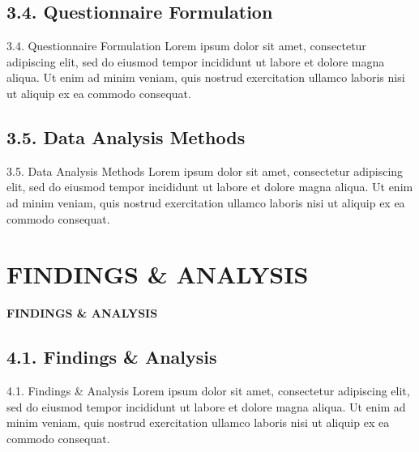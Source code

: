 \documentclass[11pt]{beamer}%
\begin{document}
\subsection{3.4. Questionnaire Formulation}
\begin{frame}{3.4. Questionnaire Formulation}
	Lorem ipsum dolor sit amet, consectetur adipiscing elit, sed do eiusmod tempor incididunt ut labore et dolore magna aliqua. Ut enim ad minim veniam, quis nostrud exercitation ullamco laboris nisi ut aliquip ex ea commodo consequat.
\end{frame}

\subsection{3.5. Data Analysis Methods}
\begin{frame}{3.5. Data Analysis Methods}
	Lorem ipsum dolor sit amet, consectetur adipiscing elit, sed do eiusmod tempor incididunt ut labore et dolore magna aliqua. Ut enim ad minim veniam, quis nostrud exercitation ullamco laboris nisi ut aliquip ex ea commodo consequat.
\end{frame}

\section{FINDINGS \& ANALYSIS}
\begin{frame}{}
	\begin{center} 
		\textbf{\huge FINDINGS \& ANALYSIS}\vspace{-30pt} 
	\end{center}
\end{frame}

\subsection{4.1. Findings \& Analysis}
\begin{frame}{4.1. Findings \& Analysis}
	Lorem ipsum dolor sit amet, consectetur adipiscing elit, sed do eiusmod tempor incididunt ut labore et dolore magna aliqua. Ut enim ad minim veniam, quis nostrud exercitation ullamco laboris nisi ut aliquip ex ea commodo consequat.
\end{frame}

\end{document}

